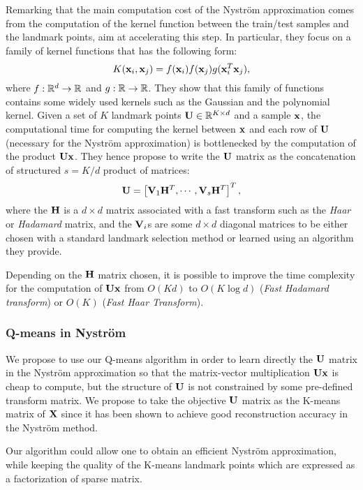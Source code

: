 Remarking that the main computation cost of the Nyström approximation comes from the computation of the kernel function between the train/test samples and the landmark points, \cite{si2016computationally} aim at accelerating this step. In particular, they focus on a family of kernel functions that has the following form:
%
\begin{equation}
 K({\mathbf{x}}_i, {\mathbf{x}}_j) = f({\mathbf{x}}_i) f({\mathbf{x}}_j) g({\mathbf{x}}_i^T{\mathbf{x}}_j),
\end{equation}
%
where $f: \mathbb{R}^d \rightarrow \mathbb{R}$ and $g: \mathbb{R} \rightarrow \mathbb{R}$. They show that this family of functions contains some widely used kernels such as the Gaussian and the polynomial kernel. Given a set of $K$ landmark points ${\mathbf{U}} \in \mathbb{R}^{K \times d}$ and a sample ${\mathbf{x}}$, the computational time for computing the kernel between ${\mathbf{x}}$ and each row of ${\mathbf{U}}$ (necessary for the Nyström approximation) is bottlenecked by the computation of the product ${\mathbf{U}}{\mathbf{x}}$. They hence propose to write the ${\mathbf{U}}$ matrix as the concatenation of structured $s = K / d$ product of matrices:
%
\begin{equation}
 {\mathbf{U}} = \left[ {\mathbf{V}}_1 {\mathbf{H}}^T, \cdots, {\mathbf{V}}_s{\mathbf{H}}^T  \right]^T,
\end{equation}
%
where the ${\mathbf{H}}$ is a $d \times d$ matrix associated with a fast transform such as the \textit{Haar} or \textit{Hadamard} matrix, and the ${\mathbf{V}}_i$s are some $d \times d$ diagonal matrices to be either chosen with a standard landmark selection method or learned using an algorithm they provide.

Depending on the ${\mathbf{H}}$ matrix chosen, it is possible to improve the time complexity for the computation of ${\mathbf{U}}{\mathbf{x}}$ from $O(Kd)$ to $O(K \log{d})$ (\textit{Fast Hadamard transform}) or $O(K)$ (\textit{Fast Haar Transform}).

\subsubsection{Q-means in Nyström}

We propose to use our Q-means algorithm in order to learn directly the ${\mathbf{U}}$ matrix in the Nyström approximation so that the matrix-vector multiplication ${\mathbf{U}} {\mathbf{x}}$ is cheap to compute, but the structure of ${\mathbf{U}}$ is not constrained by some pre-defined transform matrix. We propose to take the objective ${\mathbf{U}}$ matrix as the K-means matrix of ${\mathbf{X}}$ since it has been shown to achieve good reconstruction accuracy in the Nyström method.


Our algorithm could allow one to obtain an efficient Nyström approximation, while keeping the quality of the K-means landmark points which are expressed as a factorization of sparse matrix.  

